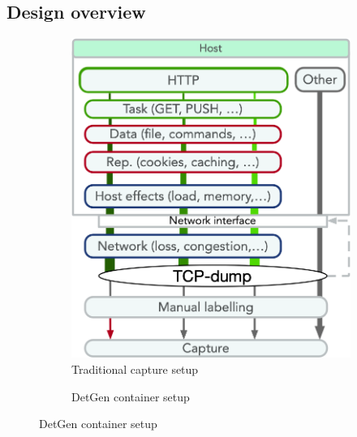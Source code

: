 \documentclass[sigconf]{acmart}
\begin{document}
\subsection{Design overview}


\begin{figure}
\centering
\begin{subfigure}[b]{0.4\textwidth}
\caption{\large Traditional capture setup}
\includegraphics[width=\textwidth]{images/VM_setup_final.png}
\end{subfigure}
\begin{subfigure}[b]{0.4\textwidth}
\caption{\large DetGen container setup}

\end{subfigure}
\end{figure}
\end{document}
